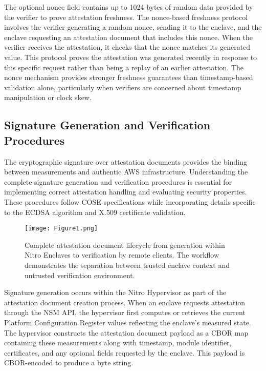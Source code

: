 The optional nonce field contains up to 1024 bytes of random data provided by the verifier to prove attestation freshness. The nonce-based freshness protocol involves the verifier generating a random nonce, sending it to the enclave, and the enclave requesting an attestation document that includes this nonce. When the verifier receives the attestation, it checks that the nonce matches its generated value. This protocol proves the attestation was generated recently in response to this specific request rather than being a replay of an earlier attestation. The nonce mechanism provides stronger freshness guarantees than timestamp-based validation alone, particularly when verifiers are concerned about timestamp manipulation or clock skew.

\subsection{Signature Generation and Verification Procedures}

The cryptographic signature over attestation documents provides the binding between measurements and authentic AWS infrastructure. Understanding the complete signature generation and verification procedures is essential for implementing correct attestation handling and evaluating security properties. These procedures follow COSE specifications while incorporating details specific to the ECDSA algorithm and X.509 certificate validation.
\begin{figure}[htbp]
    \centering
    \texttt{[image: Figure1.png]}
    \caption{Complete attestation document lifecycle from generation within Nitro Enclaves to verification by remote clients. The workflow demonstrates the separation between trusted enclave context and untrusted verification environment.}
    \label{fig:attestation_lifecycle}
\end{figure}




Signature generation occurs within the Nitro Hypervisor as part of the attestation document creation process. When an enclave requests attestation through the NSM API, the hypervisor first computes or retrieves the current Platform Configuration Register values reflecting the enclave's measured state. The hypervisor constructs the attestation document payload as a CBOR map containing these measurements along with timestamp, module identifier, certificates, and any optional fields requested by the enclave. This payload is CBOR-encoded to produce a byte string.

